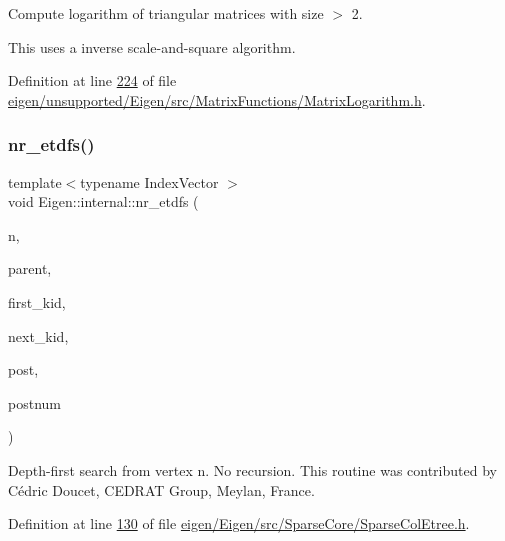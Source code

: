 Compute logarithm of triangular matrices with size $>$ 2. 

This uses a inverse scale-\/and-\/square algorithm. 

Definition at line \hyperlink{eigen_2unsupported_2_eigen_2src_2_matrix_functions_2_matrix_logarithm_8h_source_l00224}{224} of file \hyperlink{eigen_2unsupported_2_eigen_2src_2_matrix_functions_2_matrix_logarithm_8h_source}{eigen/unsupported/\+Eigen/src/\+Matrix\+Functions/\+Matrix\+Logarithm.\+h}.

\mbox{\label{namespace_eigen_1_1internal_acbd726e03f667e0dc788c6b4e92d61ec}} 
\subsubsection{\texorpdfstring{nr\+\_\+etdfs()}{nr\_etdfs()}}
{\footnotesize\ttfamily template$<$typename Index\+Vector $>$ \\
void Eigen\+::internal\+::nr\+\_\+etdfs (\begin{DoxyParamCaption}\item[{typename Index\+Vector\+::\+Scalar}]{n,  }\item[{Index\+Vector \&}]{parent,  }\item[{Index\+Vector \&}]{first\+\_\+kid,  }\item[{Index\+Vector \&}]{next\+\_\+kid,  }\item[{Index\+Vector \&}]{post,  }\item[{typename Index\+Vector\+::\+Scalar}]{postnum }\end{DoxyParamCaption})}

Depth-\/first search from vertex n. No recursion. This routine was contributed by Cédric Doucet, C\+E\+D\+R\+AT Group, Meylan, France. 

Definition at line \hyperlink{eigen_2_eigen_2src_2_sparse_core_2_sparse_col_etree_8h_source_l00130}{130} of file \hyperlink{eigen_2_eigen_2src_2_sparse_core_2_sparse_col_etree_8h_source}{eigen/\+Eigen/src/\+Sparse\+Core/\+Sparse\+Col\+Etree.\+h}.

\mbox{\label{namespace_eigen_1_1internal_a58a0ccf0e71d88beeb5dcf72ed0bdd5f}} 
